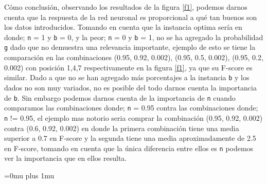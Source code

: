 \documentclass{article}
\begin{document}
Cómo conclusión, observando los resultados de la figura \ref{f1}, podemos darnos cuenta que la respuesta de la red neuronal es proporcional a qué tan buenos son los datos introducidos. Tomando en cuenta que la instancia optima sería en donde; \texttt{n} = 1 y \texttt{b} = 0, y la peor; \texttt{n} = 0 y \texttt{b} = 1, no se ha agregado la probabilidad \texttt{g} dado que no demuestra una relevancia importante, ejemplo de esto se tiene la comparación en las combinaciones (0.95, 0.92, 0.002), (0.95, 0.5, 0.002), (0.95, 0.2, 0.002) con posición 1,4,7 respectivamente en la figura \ref{f1}, ya que su F-score es similar. Dado a que no se han agregado más porcentajes a la instancia \texttt{b}  y los dados no son muy variados, no es posible del todo darnos cuenta la importancia de \texttt{b}. Sin embargo podemos darnos cuenta de la importancia de \texttt{n} cuando comparamos las combinaciones donde; \texttt{n} = 0.95 contra las combinaciones donde; \texttt{n} != 0.95, el ejemplo mas notorio seria comprar la combinación (0.95, 0.92, 0.002) contra (0.6, 0.92, 0.002) en donde la primera combinación tiene una media superior a 0.7 en F-score y la segunda tiene una media aproximadamente de 2.5 en F-score, tomando en cuenta que la única diferencia entre ellos es \texttt{n} podemos ver la importancia que en ellos resulta.

\Urlmuskip=0mu plus 1mu\relax


\end{document}
